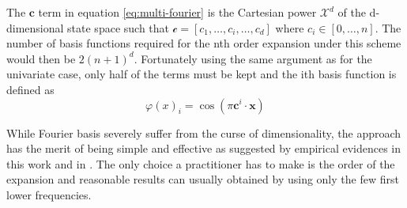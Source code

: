 The $\mathbf{c}$ term in equation \ref{eq:multi-fourier} is the Cartesian power 
$\mathcal{X}^d$ of the d-dimensional state space such that $\mathcal{c} = [c_1,
\dots, c_i, \dots, c_d]$ where $c_i \in [0, \dots, n]$. The number of basis functions
required for the nth order expansion under this scheme would then be $2(n+1)^d$.
Fortunately using the same argument as for the univariate case, only half of the terms
must be kept and the ith basis function is defined as
\begin{equation}
\varphi(x)_i = \cos \left(  \pi \mathbf{c}^i \cdot \mathbf{x} \right)
\end{equation}

While Fourier basis severely suffer from the curse of dimensionality, the approach has
the merit of being simple and effective as suggested by empirical evidences in this
work and in \cite{Konidaris2011b} . The only choice a practitioner has to make is the
order of the expansion and reasonable results can usually obtained by using only the
few first lower frequencies.
